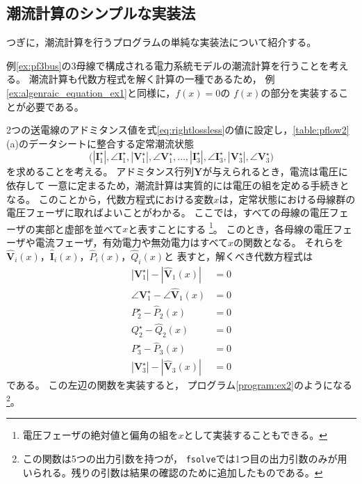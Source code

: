 \documentclass[tombow,dvipdfmx]{corona-a5-1.1}
\begin{document}
\subsection{潮流計算のシンプルな実装法}
つぎに，潮流計算を行うプログラムの単純な実装法について紹介する。
\begin{例}[潮流計算の実装法]\label{ex:simplepowerflow}
例\ref{ex:pf3bus}の3母線で構成される電力系統モデルの潮流計算を行うことを考える。
潮流計算も代数方程式を解く計算の一種であるため，
例\nobreak\ref{ex:algenraic_equation_ex1}と同様に，$f(x)=0$の
$f(x)$の部分を実装することが必要である。

2つの送電線のアドミタンス値を式\ref{eq:rightlossless}の値に設定し，\ref{table:pflow2}(a)のデータシートに整合する定常潮流状態
\[
\bigl(
|\bm{I}_1^{\star}|,\angle \bm{I}_1^{\star},
|\bm{V}_1^{\star}|,\angle \bm{V}_1^{\star},
\ldots,
|\bm{I}_3^{\star}|,\angle \bm{I}_3^{\star},
|\bm{V}_3^{\star}|,\angle \bm{V}_3^{\star}
\bigr)
\]
を求めることを考える。
アドミタンス行列$\bm Y$が与えられるとき，電流は電圧に依存して
一意に定まるため，潮流計算は実質的には電圧の組を定める手続きとなる。
このことから，代数方程式における変数$x$は，定常状態における母線群の電圧フェーザに取ればよいことがわかる。
ここでは，すべての母線の電圧フェーザの実部と虚部を並べて$x$と表すことにする
\footnote{電圧フェーザの絶対値と偏角の組を$x$として実装することもできる。}。
このとき，各母線の電圧フェーザや電流フェーザ，有効電力や無効電力はすべて$x$の関数となる。
それらを$\hat{\bm V}_i(x)$，$\hat{\bm I}_i(x)$，$\hat{P}_i(x)$，$\hat{Q}_i(x)$と
表すと，解くべき代数方程式は
\begin{align*}
    |\bm V_1^{\star}|-|\hat{\bm V}_1(x)| &= 0\\
    \angle \bm V_1^{\star} - \angle \hat{\bm V}_1(x) &= 0\\
    P_2^{\star} -\hat P_2(x) &= 0\\
    Q_2^{\star} -\hat Q_2(x) &= 0\\
    P_3^{\star} -\hat P_3(x) &= 0\\
    |\bm V_3^{\star}|-|\hat{\bm V}_3(x)| &= 0
 \end{align*}
 である。
 この左辺の関数を実装すると，
 プログラム\nobreak\ref{program:ex2}のようになる \footnote{この関数は5つの出力引数を持つが，
 \texttt{fsolve}では1つ目の出力引数のみが用いられる。残りの引数は結果の確認のために追加したものである。}。



\end{例}
\end{document}
